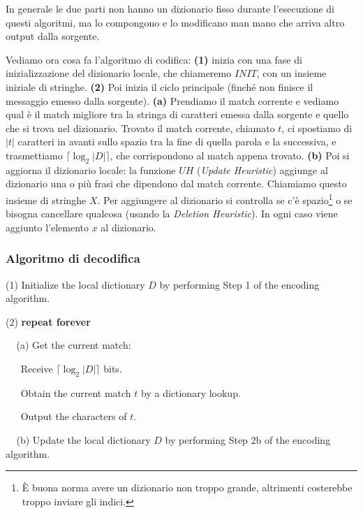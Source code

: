 In generale le due parti non hanno un dizionario fisso durante l'esecuzione di questi algoritmi, ma lo compongono e lo modificano man mano che arriva altro output dalla sorgente. 

\vspace{5mm}

Vediamo ora cosa fa l'algoritmo di codifica: \textbf{(1)} inizia con una fase di inizializzazione del dizionario locale, che chiameremo \(INIT\), con un insieme iniziale di stringhe. \textbf{(2)} Poi inizia il ciclo principale (finché non finisce il messaggio emesso dalla sorgente). \textbf{(a)} Prendiamo il match corrente e vediamo qual è il match migliore tra la stringa di caratteri emessa dalla sorgente e quello che si trova nel dizionario. Trovato il match corrente, chiamato \(t\), ci spostiamo di \(|t|\) caratteri in avanti sullo spazio tra la fine di quella parola e la successiva, e trasmettiamo \(\lceil \log_2 |D| \rceil\), che corrispondono al match appena trovato. \textbf{(b)} Poi si aggiorna il dizionario locale: la funzione \(UH\) (\textit{Update Heuristic}) aggiunge al dizionario una o più frasi che dipendono dal match corrente. Chiamiamo questo insieme di stringhe \(X\). Per aggiungere al dizionario si controlla se c'è spazio\footnote{È buona norma avere un dizionario non troppo grande, altrimenti costerebbe troppo inviare gli indici.} o se bisogna cancellare qualcosa (usando la \textit{Deletion Heuristic}). In ogni caso viene aggiunto l'elemento \(x\) al dizionario.

\subsubsection{Algoritmo di decodifica}
\begin{mdframed}[backgroundcolor=gray!20,shadow=false]
(1) Initialize the local dictionary \(D\) by performing Step 1 of the encoding algorithm.

\vspace{3mm}

(2) \textbf{repeat forever}

\vspace{3mm}

\(\>\>\>\>\>\)(a) Get the current match:

\(\>\>\>\>\>\>\>\)Receive \(\lceil \log_2 |D| \rceil\) bits.

\(\>\>\>\>\>\>\>\)Obtain the current match \(t\) by a dictionary lookup.

\(\>\>\>\>\>\>\>\)Output the characters of \(t\).

\vspace{3mm}

\(\>\>\>\>\>\)(b) Update the local dictionary \(D\) by performing Step 2b of the encoding algorithm.
\end{mdframed}
\vspace{5mm}

